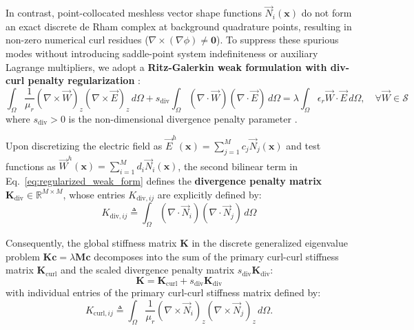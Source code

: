 \documentclass[preprint,12pt]{elsarticle}
\begin{document}
In contrast, point-collocated meshless vector shape functions $\vec{N}_i(\mathbf{x})$ do not form an exact discrete de Rham complex at background quadrature points, resulting in non-zero numerical curl residues ($\nabla \times (\nabla \phi) \neq \mathbf{0}$). To suppress these spurious modes without introducing saddle-point system indefiniteness or auxiliary Lagrange multipliers, we adopt a \textbf{Ritz-Galerkin weak formulation with div-curl penalty regularization} \cite{monk2003finite, bossavit1998computational}:
\begin{equation}
\int_{\Omega} \frac{1}{\mu_r} (\nabla \times \vec{W})_z (\nabla \times \vec{E})_z \, d\Omega + s_{\mathrm{div}} \int_{\Omega} (\nabla \cdot \vec{W}) (\nabla \cdot \vec{E}) \, d\Omega = \lambda \int_{\Omega} \epsilon_r \vec{W} \cdot \vec{E} \, d\Omega, \quad \forall \vec{W} \in \mathcal{S}
\label{eq:regularized_weak_form}
\end{equation}
where $s_{\mathrm{div}} > 0$ is the non-dimensional divergence penalty parameter \cite{monk2003finite}.

Upon discretizing the electric field as $\vec{E}^h(\mathbf{x}) = \sum_{j=1}^{M} c_j \vec{N}_j(\mathbf{x})$ and test functions as $\vec{W}^h(\mathbf{x}) = \sum_{i=1}^{M} d_i \vec{N}_i(\mathbf{x})$, the second bilinear term in Eq.~\eqref{eq:regularized_weak_form} defines the \textbf{divergence penalty matrix} $\mathbf{K}_{\mathrm{div}} \in \mathbb{R}^{M \times M}$, whose entries $K_{\mathrm{div}, ij}$ are explicitly defined by:
\begin{equation}
K_{\mathrm{div}, ij} \triangleq \int_{\Omega} (\nabla \cdot \vec{N}_i) (\nabla \cdot \vec{N}_j) \, d\Omega
\label{eq:K_div_definition}
\end{equation}

Consequently, the global stiffness matrix $\mathbf{K}$ in the discrete generalized eigenvalue problem $\mathbf{K} \mathbf{c} = \lambda \mathbf{M} \mathbf{c}$ decomposes into the sum of the primary curl-curl stiffness matrix $\mathbf{K}_{\mathrm{curl}}$ and the scaled divergence penalty matrix $s_{\mathrm{div}} \mathbf{K}_{\mathrm{div}}$:
\begin{equation}
\mathbf{K} = \mathbf{K}_{\mathrm{curl}} + s_{\mathrm{div}} \mathbf{K}_{\mathrm{div}}
\label{eq:K_global_decomposition}
\end{equation}
with individual entries of the primary curl-curl stiffness matrix defined by:
\begin{equation}
K_{\mathrm{curl}, ij} \triangleq \int_{\Omega} \frac{1}{\mu_r} (\nabla \times \vec{N}_i)_z (\nabla \times \vec{N}_j)_z \, d\Omega.
\label{eq:K_curl_definition}
\end{equation}
\end{document}
